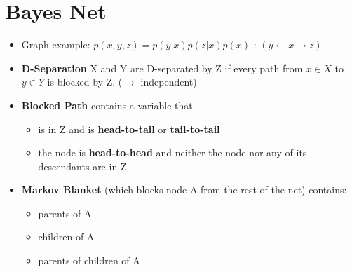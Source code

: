 \section{Bayes Net}
\begin{itemize}
	\item Graph example: $p(x, y, z) = p(y | x) p(z | x) p(x)$ : $(y \leftarrow x \rightarrow z)$ 
	\item \textbf{D-Separation} X and Y are D-separated by Z if every path from $ x \in X$ to $y \in Y$ is blocked by Z. ($\rightarrow$ independent)
	\item \textbf{Blocked Path} contains a variable that
	\begin{itemize}
		\item is in Z and is \textbf{head-to-tail} or \textbf{tail-to-tail}
		\item the node is \textbf{head-to-head} and neither the node nor any of its descendants are in Z.
	\end{itemize}	
	\item \textbf{Markov Blanket} (which blocks node A from the rest of the net) contains:
	\begin{itemize}
		\item parents of A
		\item children of A
		\item parents of children of A
	\end{itemize}
	
\end{itemize}






